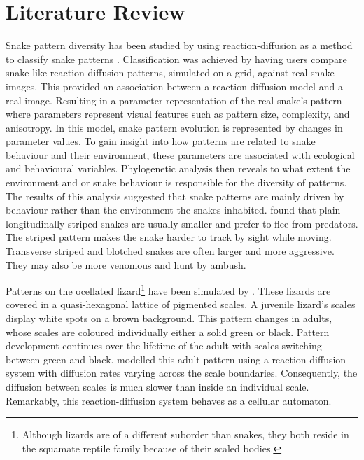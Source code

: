 \section{Literature Review}
Snake pattern diversity has been studied by using reaction-diffusion as a method to classify snake patterns \citep{Allen2013}. Classification was achieved by having users compare snake-like reaction-diffusion patterns, simulated on a grid, against real snake images. This provided an association between a reaction-diffusion model and a real image. Resulting in a parameter representation of the real snake’s pattern where parameters represent visual features such as pattern size, complexity, and anisotropy. In this model, snake pattern evolution is represented by changes in parameter values. To gain insight into how patterns are related to snake behaviour and their environment, these parameters are associated with ecological and behavioural variables. Phylogenetic analysis then reveals to what extent the environment and or  snake behaviour is responsible for the diversity of patterns. The results of this analysis suggested that snake patterns are mainly driven by behaviour rather than the environment the snakes inhabited. \citet{Allen2013} found that plain longitudinally striped snakes are usually smaller and prefer to flee from predators. The striped pattern makes the snake harder to track by sight while moving. Transverse striped and blotched snakes are often larger and more aggressive. They may also be more venomous and hunt by ambush.

Patterns on the ocellated lizard\footnote{Although lizards are of a different suborder than snakes, they both reside in the squamate reptile family because of their scaled bodies.} have been simulated by \citet{manukyan2017}. These lizards are covered in a quasi-hexagonal lattice of pigmented scales. A juvenile lizard's scales display white spots on a brown background. This pattern changes in adults, whose scales are coloured individually either a solid green or black. Pattern development continues over the lifetime of the adult with scales switching between green and black. \citet{manukyan2017} modelled this adult pattern using a reaction-diffusion system with diffusion rates varying across the scale boundaries. Consequently, the diffusion between scales is much slower than inside an individual scale. Remarkably, this reaction-diffusion system behaves as a cellular automaton.

